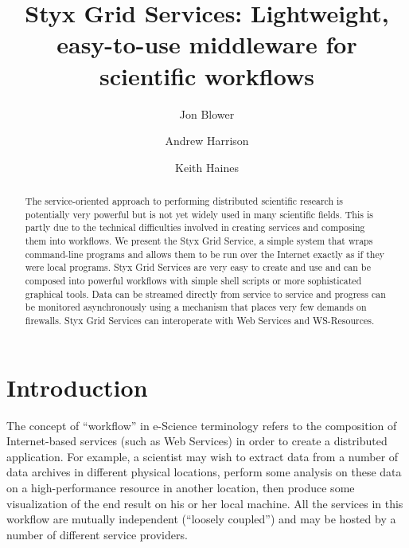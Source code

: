 \documentclass{llncs}
\begin{document}
%
\title{Styx Grid Services: Lightweight, easy-to-use middleware for scientific workflows}
%
%
\author{Jon Blower \and Andrew Harrison \and Keith Haines}
%
%
%

\maketitle              %

\begin{abstract}
The service-oriented approach to performing distributed scientific research is potentially very powerful but is not yet widely used in many scientific fields.  This is partly due to the technical difficulties involved in creating services and composing them into workflows.  We present the Styx Grid Service, a simple system that wraps command-line programs and allows them to be run over the Internet exactly as if they were local programs.  Styx Grid Services are very easy to create and use and can be composed into powerful workflows with simple shell scripts or more sophisticated graphical tools.  Data can be streamed directly from service to service and progress can be monitored asynchronously using a mechanism that places very few demands on firewalls.  Styx Grid Services can interoperate with Web Services and WS-Resources.
\end{abstract}
%
\section{Introduction}\label{sec:intro}

The concept of ``workflow'' in e-Science terminology refers to the composition of Internet-based services (such as Web Services) in order to create a distributed application.  For example, a scientist may wish to extract data from a number of data archives in different physical locations, perform some analysis on these data on a high-performance resource in another location, then produce some visualization of the end result on his or her local machine.  All the services in this workflow are mutually independent (``loosely coupled'') and may be hosted by a number of different service providers.
\end{document}
